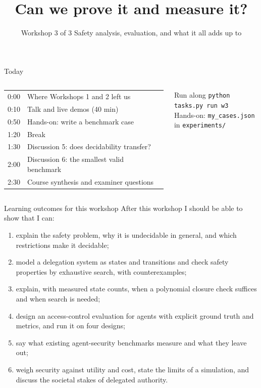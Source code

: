 \documentclass[aspectratio=169, 10pt]{beamer}
\title{Can we prove it and measure it?}
\subtitle{Workshop 3 of 3 \textperiodcentered{} Safety analysis, evaluation, and what it all adds up to}
\date{\prep{set the workshop date}}
\begin{document}
\maketitle

\begin{frame}{Today}
  \begin{columns}[T]
    \small
    \begin{tabular}{@{}l l@{}}
      0:00 & Where Workshops 1 and 2 left us \\
      0:10 & Talk and live demos (40 min) \\
      0:50 & Hands-on: write a benchmark case \\
      1:20 & Break \\
      1:30 & Discussion 5: does decidability transfer? \\
      2:00 & Discussion 6: the smallest valid benchmark \\
      2:30 & Course synthesis and examiner questions \\
    \end{tabular}
    \begin{block}{Run along}
      \footnotesize\texttt{python tasks.py run w3}\\[2pt]
      Hands-on: \texttt{my\_cases.json} in \texttt{experiments/}
    \end{block}
  \end{columns}
\end{frame}

\begin{frame}{Learning outcomes for this workshop}
  \small After this workshop I should be able to show that I can:
  \begin{enumerate}
    \item[K3.1] explain the safety problem, why it is undecidable in general, and which restrictions make it decidable;
    \item[S3.2] model a delegation system as states and transitions and check safety properties by exhaustive search, with counterexamples;
    \item[S3.3] explain, with measured state counts, when a polynomial closure check suffices and when search is needed;
    \item[S3.4] design an access-control evaluation for agents with explicit ground truth and metrics, and run it on four designs;
    \item[J3.5] say what existing agent-security benchmarks measure and what they leave out;
    \item[J3.6] weigh security against utility and cost, state the limits of a simulation, and discuss the societal stakes of delegated authority.
  \end{enumerate}
\end{frame}
\end{document}
